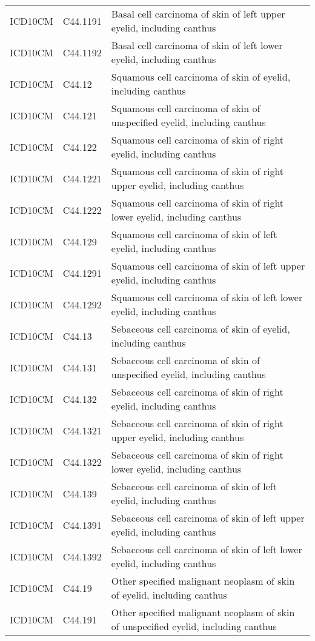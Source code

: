 \begin{longtable}{p{}p{}p{}}
  ICD10CM & C44.1191 & Basal cell carcinoma of skin of left upper eyelid, including canthus \\ 
  ICD10CM & C44.1192 & Basal cell carcinoma of skin of left lower eyelid, including canthus \\ 
  ICD10CM & C44.12 & Squamous cell carcinoma of skin of eyelid, including canthus \\ 
  ICD10CM & C44.121 & Squamous cell carcinoma of skin of unspecified eyelid, including canthus \\ 
  ICD10CM & C44.122 & Squamous cell carcinoma of skin of right eyelid, including canthus \\ 
  ICD10CM & C44.1221 & Squamous cell carcinoma of skin of right upper eyelid, including canthus \\ 
  ICD10CM & C44.1222 & Squamous cell carcinoma of skin of right lower eyelid, including canthus \\ 
  ICD10CM & C44.129 & Squamous cell carcinoma of skin of left eyelid, including canthus \\ 
  ICD10CM & C44.1291 & Squamous cell carcinoma of skin of left upper eyelid, including canthus \\ 
  ICD10CM & C44.1292 & Squamous cell carcinoma of skin of left lower eyelid, including canthus \\ 
  ICD10CM & C44.13 & Sebaceous cell carcinoma of skin of eyelid, including canthus \\ 
  ICD10CM & C44.131 & Sebaceous cell carcinoma of skin of unspecified eyelid, including canthus \\ 
  ICD10CM & C44.132 & Sebaceous cell carcinoma of skin of right eyelid, including canthus \\ 
  ICD10CM & C44.1321 & Sebaceous cell carcinoma of skin of right upper eyelid, including canthus \\ 
  ICD10CM & C44.1322 & Sebaceous cell carcinoma of skin of right lower eyelid, including canthus \\ 
  ICD10CM & C44.139 & Sebaceous cell carcinoma of skin of left eyelid, including canthus \\ 
  ICD10CM & C44.1391 & Sebaceous cell carcinoma of skin of left upper eyelid, including canthus \\ 
  ICD10CM & C44.1392 & Sebaceous cell carcinoma of skin of left lower eyelid, including canthus \\ 
  ICD10CM & C44.19 & Other specified malignant neoplasm of skin of eyelid, including canthus \\ 
  ICD10CM & C44.191 & Other specified malignant neoplasm of skin of unspecified eyelid, including canthus \\ 

\end{longtable}
